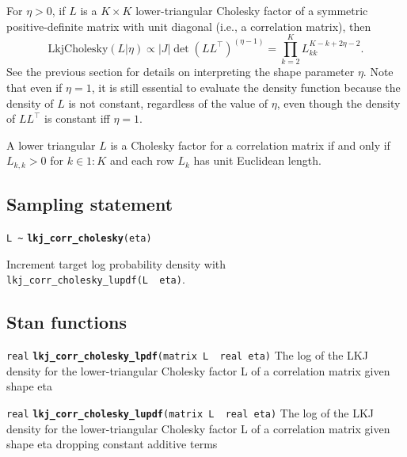 \documentclass[
  10pt,
]{book}
\begin{document}
For \(\eta > 0\), if \(L\) is a \(K \times K\) lower-triangular Cholesky
factor of a symmetric positive-definite matrix with unit diagonal
(i.e., a correlation matrix), then \[ \text{LkjCholesky}(L|\eta)
\propto \left|J\right|\det(L L^\top)^{(\eta - 1)} = \prod_{k=2}^K
L_{kk}^{K-k+2\eta-2}. \] See the previous section for details on
interpreting the shape parameter \(\eta\). Note that even if \(\eta=1\),
it is still essential to evaluate the density function because the
density of \(L\) is not constant, regardless of the value of \(\eta\),
even though the density of \(LL^\top\) is constant iff \(\eta=1\).

A lower triangular \(L\) is a Cholesky factor for a correlation matrix
if and only if \(L_{k,k} > 0\) for \(k \in 1{:}K\) and each row \(L_k\) has
unit Euclidean length.

\hypertarget{sampling-statement-58}{%
\subsection{Sampling statement}\label{sampling-statement-58}}

\texttt{L\ \textasciitilde{}} \textbf{\texttt{lkj\_corr\_cholesky}}\texttt{(eta)}

Increment target log probability density with \texttt{lkj\_corr\_cholesky\_lupdf(L\ \textbar{}\ eta)}.

\hypertarget{stan-functions-57}{%
\subsection{Stan functions}\label{stan-functions-57}}


\texttt{real} \textbf{\texttt{lkj\_corr\_cholesky\_lpdf}}\texttt{(matrix\ L\ \textbar{}\ real\ eta)}\newline
The log of the LKJ density for the lower-triangular Cholesky factor L
of a correlation matrix given shape eta


\texttt{real} \textbf{\texttt{lkj\_corr\_cholesky\_lupdf}}\texttt{(matrix\ L\ \textbar{}\ real\ eta)}\newline
The log of the LKJ density for the lower-triangular Cholesky factor L
of a correlation matrix given shape eta dropping constant additive terms
\end{document}
